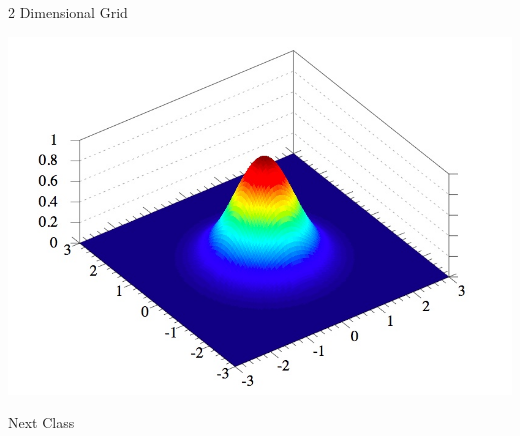 \documentclass[11pt]{beamer}
\begin{document}
\begin{frame}[fragile]{2 Dimensional Grid}
\begin{center}
\includegraphics[scale=0.3]{Gaussian2}
\end{center}
\end{frame}

\begin{frame}[fragile]{Next Class}
\end{frame}
\end{document}
